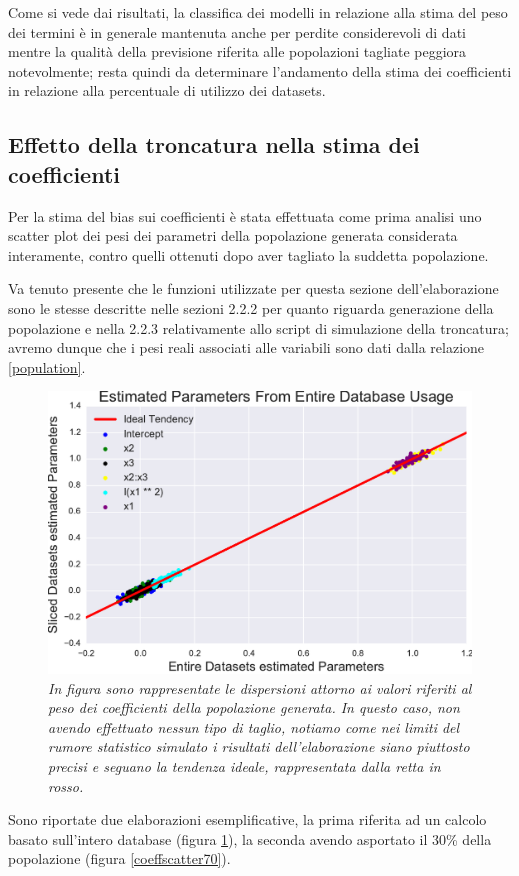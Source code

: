 \documentclass[12pt,openright,twoside,a4paper]{book}
\begin{document}
Come si vede dai risultati, la classifica dei modelli in relazione alla stima del peso dei termini è in generale mantenuta anche per perdite considerevoli di dati mentre la qualità della previsione riferita alle popolazioni tagliate peggiora notevolmente; resta quindi da determinare l'andamento della stima dei coefficienti in relazione alla percentuale di utilizzo dei datasets.


\subsection{Effetto della troncatura nella stima dei coefficienti }

Per la stima del bias sui coefficienti è stata effettuata come prima analisi uno scatter plot dei pesi dei parametri della popolazione generata considerata interamente, contro quelli ottenuti dopo aver tagliato la suddetta popolazione.

Va tenuto presente che le funzioni utilizzate per questa sezione dell'elaborazione sono le stesse descritte nelle sezioni  2.2.2 per quanto riguarda generazione della popolazione e nella 2.2.3 relativamente allo script di simulazione della troncatura; avremo dunque che i pesi reali associati alle variabili sono dati dalla relazione \ref{population}.

\begin{figure}[!h]
\centering
\includegraphics[width=0.55\linewidth]{coeffscatter100}
\caption{\textit{In figura sono rappresentate le dispersioni attorno ai valori riferiti al peso dei coefficienti della popolazione generata.
In questo caso, non avendo effettuato nessun tipo di taglio, notiamo come nei limiti del rumore statistico simulato i risultati dell'elaborazione siano piuttosto precisi e seguano la tendenza ideale, rappresentata dalla retta in rosso.}}
\label{coeffscatter100}
\end{figure}

 Sono riportate due elaborazioni esemplificative, la prima riferita ad un calcolo basato sull'intero database (figura \ref{coeffscatter100}), la seconda avendo asportato il 30\% della popolazione (figura \ref{coeffscatter70}).
\end{document}
